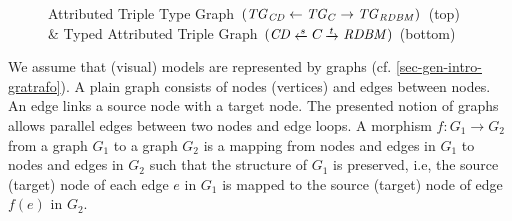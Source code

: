 \begin{figure}[!tb]
\begin{center}
\end{center}
\caption{Attributed Triple Type Graph $(\mathit{TG}_\mathit{CD} \gets \mathit{TG}_C \to \mathit{TG}_\mathit{RDBM})$ (top) \& Typed Attributed Triple Graph $(\CD \transB{s} C \trans{t} \RDBM)$ (bottom)}
\label{fig:sec-gt-graphs:atg}
\label{fig:mm}
\end{figure}

We assume that (visual) models are represented by graphs (cf. \cref{sec-gen-intro-gratrafo}).
A plain graph consists of nodes (vertices) and edges between nodes.
An edge links a source node with a target node.
The presented notion of graphs allows parallel edges between two nodes and edge loops.
A morphism $f\colon G_1 \to G_2$ from a graph $G_1$ to a graph $G_2$ is a mapping from nodes and edges in $G_1$ to nodes and edges in $G_2$ such that the structure of $G_1$ is preserved, i.e, the source (target) node of each edge $e$ in $G_1$ is mapped to the source (target) node of edge $f(e)$ in $G_2$.

